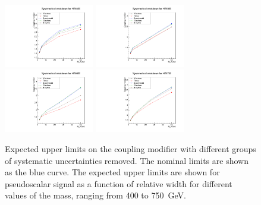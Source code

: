 \begin{figure}[!Hhtb]
\centering
\includegraphics[width=0.35\textwidth,keepaspectratio=true]{fig/app5/breakdowns/generic_breakdown_H_M400.pdf}
\includegraphics[width=0.35\textwidth,keepaspectratio=true]{fig/app5/breakdowns/generic_breakdown_H_M500.pdf}
\includegraphics[width=0.35\textwidth,keepaspectratio=true]{fig/app5/breakdowns/generic_breakdown_H_M600.pdf}
\includegraphics[width=0.35\textwidth,keepaspectratio=true]{fig/app5/breakdowns/generic_breakdown_H_M750.pdf}
\caption{Expected upper limits on the coupling modifier with different groups of systematic uncertainties removed. The nominal limits are shown as the blue curve. The expected upper limits are shown for pseudoscalar signal as a function of relative width for different values of the mass, ranging from 400 to 750~GeV.}
\label{fig:breakdown_hmass}
\end{figure}

